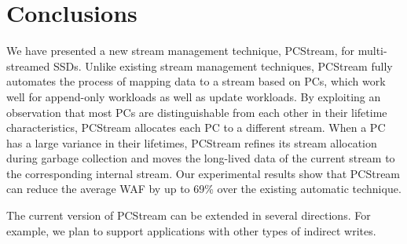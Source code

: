 \section{Conclusions}

We have presented a new stream management technique, \textsf{\small PCStream}, 
for multi-streamed SSDs.  
Unlike existing stream management techniques, \textsf{\small PCStream} fully automates 
the process of mapping data to a stream based on PCs, 
which work well for append-only workloads as well as update workloads.  
By exploiting an observation that most PCs are distinguishable from each other 
in their lifetime characteristics, \textsf{\small PCStream} allocates 
each PC to a different stream.  
When a PC has a large variance in their lifetimes, 
\textsf{\small PCStream} refines its stream allocation 
during garbage collection and moves the long-lived data of 
the current stream to the corresponding internal stream.
Our experimental results show that \textsf{\small PCStream} can reduce 
the average WAF by up to 69\% over the existing automatic technique.

The current version of \textsf{\small PCStream} can be extended in several directions.  
For example, we plan to support applications with other types of indirect writes.

